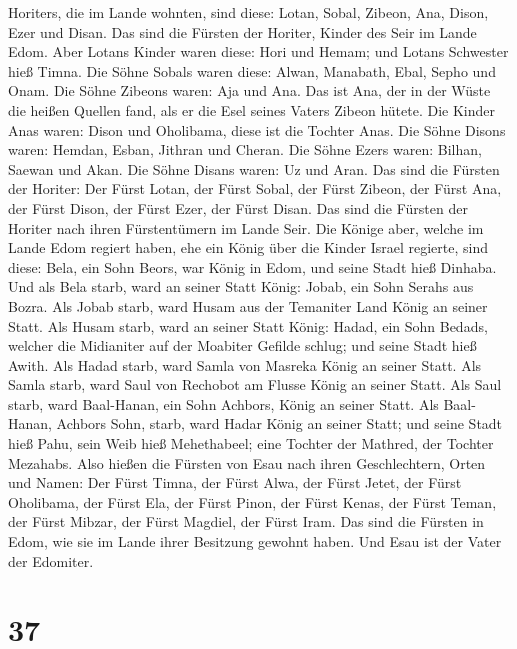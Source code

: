 Horiters, die im Lande wohnten, sind diese: Lotan, Sobal, Zibeon, Ana,
 Dison, Ezer und Disan. Das sind die Fürsten der Horiter,
Kinder des Seir im Lande Edom.  Aber Lotans Kinder waren
diese: Hori und Hemam; und Lotans Schwester hieß Timna. 
Die Söhne Sobals waren diese: Alwan, Manabath, Ebal, Sepho und Onam.
 Die Söhne Zibeons waren: Aja und Ana. Das ist Ana, der
in der Wüste die heißen Quellen fand, als er die Esel seines Vaters
Zibeon hütete.  Die Kinder Anas waren: Dison und
Oholibama, diese ist die Tochter Anas.  Die Söhne Disons
waren: Hemdan, Esban, Jithran und Cheran.  Die Söhne
Ezers waren: Bilhan, Saewan und Akan.  Die Söhne Disans
waren: Uz und Aran.  Das sind die Fürsten der Horiter:
Der Fürst Lotan, der Fürst Sobal, der Fürst Zibeon, der Fürst Ana,
 der Fürst Dison, der Fürst Ezer, der Fürst Disan. Das
sind die Fürsten der Horiter nach ihren Fürstentümern im Lande Seir.
 Die Könige aber, welche im Lande Edom regiert haben, ehe
ein König über die Kinder Israel regierte, sind diese: 
Bela, ein Sohn Beors, war König in Edom, und seine Stadt hieß Dinhaba.
 Und als Bela starb, ward an seiner Statt König: Jobab,
ein Sohn Serahs aus Bozra.  Als Jobab starb, ward Husam
aus der Temaniter Land König an seiner Statt.  Als Husam
starb, ward an seiner Statt König: Hadad, ein Sohn Bedads, welcher die
Midianiter auf der Moabiter Gefilde schlug; und seine Stadt hieß Awith.
 Als Hadad starb, ward Samla von Masreka König an seiner
Statt.  Als Samla starb, ward Saul von Rechobot am Flusse
König an seiner Statt.  Als Saul starb, ward Baal-Hanan,
ein Sohn Achbors, König an seiner Statt.  Als Baal-Hanan,
Achbors Sohn, starb, ward Hadar König an seiner Statt; und seine Stadt
hieß Pahu, sein Weib hieß Mehethabeel; eine Tochter der Mathred, der
Tochter Mezahabs.  Also hießen die Fürsten von Esau nach
ihren Geschlechtern, Orten und Namen: Der Fürst Timna, der Fürst Alwa,
der Fürst Jetet,  der Fürst Oholibama, der Fürst Ela, der
Fürst Pinon,  der Fürst Kenas, der Fürst Teman, der Fürst
Mibzar,  der Fürst Magdiel, der Fürst Iram. Das sind die
Fürsten in Edom, wie sie im Lande ihrer Besitzung gewohnt haben. Und
Esau ist der Vater der Edomiter.

\hypertarget{section-36}{%
\section{37}\label{section-36}}

